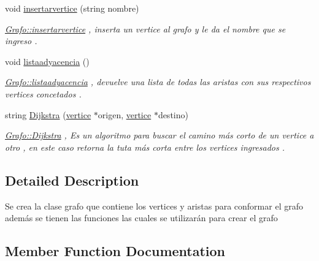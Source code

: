\begin{DoxyCompactItemize}
\mbox{\label{class_grafo_aaa950070e4eb04903077e5470ecb6c37}} 
void \hyperlink{class_grafo_aaa950070e4eb04903077e5470ecb6c37}{insertarvertice} (string nombre)
\begin{DoxyCompactList}\small\item\em \hyperlink{class_grafo_aaa950070e4eb04903077e5470ecb6c37}{Grafo\+::insertarvertice} , inserta un vertice al grafo y le da el nombre que se ingreso . \end{DoxyCompactList}\item 
\mbox{\label{class_grafo_a2eacbfeb64a1b64cae38c2e8dbb45970}} 
void \hyperlink{class_grafo_a2eacbfeb64a1b64cae38c2e8dbb45970}{listaadyacencia} ()
\begin{DoxyCompactList}\small\item\em \hyperlink{class_grafo_a2eacbfeb64a1b64cae38c2e8dbb45970}{Grafo\+::listaadyacencia} , devuelve una lista de todas las aristas con sus respectivos vertices concetados . \end{DoxyCompactList}\item 
\mbox{\label{class_grafo_ad28ca6958013b075262955ef132a80e7}} 
string \hyperlink{class_grafo_ad28ca6958013b075262955ef132a80e7}{Dijkstra} (\hyperlink{classvertice}{vertice} $\ast$origen, \hyperlink{classvertice}{vertice} $\ast$destino)
\begin{DoxyCompactList}\small\item\em \hyperlink{class_grafo_ad28ca6958013b075262955ef132a80e7}{Grafo\+::\+Dijkstra} , Es un algoritmo para buscar el camino más corto de un vertice a otro , en este caso retorna la tuta más corta entre los vertices ingresados . \end{DoxyCompactList}\end{DoxyCompactItemize}


\subsection{Detailed Description}
Se crea la clase grafo que contiene los vertices y aristas para conformar el grafo además se tienen las funciones las cuales se utilizarán para crear el grafo 

\subsection{Member Function Documentation}
\mbox{\label{class_grafo_ad0ae89382a426e06cedf7168dc474820}} 
